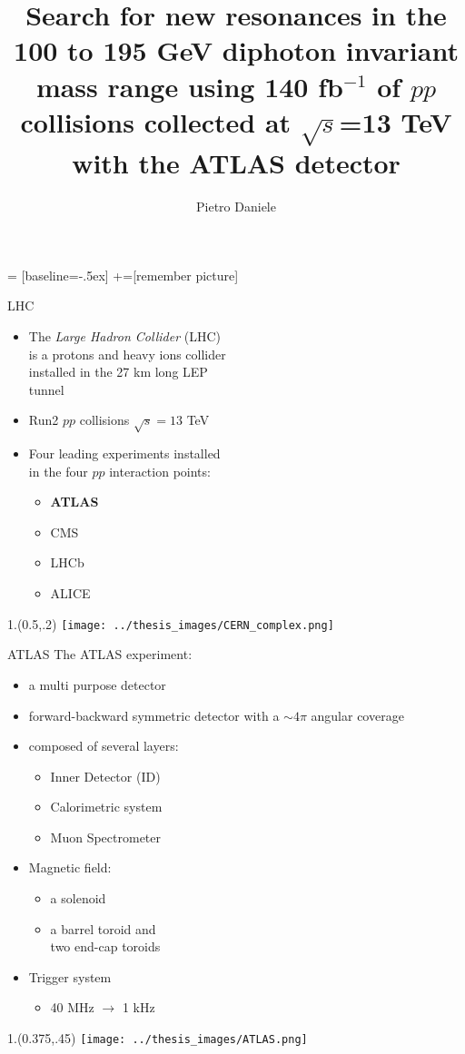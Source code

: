 \documentclass[10pt,UKenglish, leqno, xcolor = dvipsnames]{beamer}
\author{Pietro Daniele}
\title{\large Search for new resonances in the 100 to 195 GeV diphoton invariant mass range using 140 fb$^{-1}$ of $pp$ collisions collected at $\sqrt{s}$=13 TeV with the ATLAS detector}
\begin{document}
	 = [baseline=-.5ex]
	+=[remember picture]
	
	\begin{frame}{LHC}
		\vfill
		\begin{itemize}
			\item The \textit{Large Hadron Collider} (LHC) \\is a protons and heavy ions collider\\ installed in the 27 km long LEP \\tunnel
			\item Run2 $pp$ collisions $\sqrt{s} = 13$ TeV
			\item Four leading experiments installed\\ in the four $pp$ interaction points:
			\begin{itemize}
				\item \textbf{ATLAS}
				\item CMS
				\item LHCb
				\item ALICE
			\end{itemize}
		\end{itemize}
		\vfill
		\begin{textblock}{1.}(0.5,.2)
			\texttt{[image: ../thesis\_images/CERN\_complex.png]}
		\end{textblock}
	\end{frame}

	\begin{frame}{ATLAS}
		\vfill
		The ATLAS experiment:
		\begin{itemize}
			\item a multi purpose detector
			\item forward-backward symmetric detector with a $\sim4\pi$ angular coverage
			\item composed of several layers:
			\begin{itemize}
				\item Inner Detector (ID)
				\item Calorimetric system
				\item Muon Spectrometer
			\end{itemize}
			\item Magnetic field:
			\begin{itemize}
				\item a solenoid
				\item a barrel toroid and\\ two end-cap toroids
			\end{itemize}
			\item Trigger system
			\begin{itemize}
				\item 40 MHz $\to$ 1 kHz
			\end{itemize}
			
		\end{itemize}
		\vfill
		\begin{textblock}{1.}(0.375,.45)
			\texttt{[image: ../thesis\_images/ATLAS.png]}
		\end{textblock}
	\end{frame}
\end{document}
